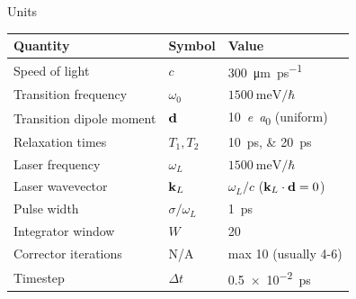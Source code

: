 \documentclass[aspectratio=169]{beamer}
\begin{document}
\begin{frame}{Units}
  \begin{table}
    \begin{tabular}{lll}
      Quantity                 & Symbol            & Value                        \\ \hline \hline
      Speed of light           & $c$               & \SI{300}{\micro\meter \per \pico\second} \\
      Transition frequency     & $\omega_0$        & $\SI{1500}{\milli\eV}/\hbar$ \\
      Transition dipole moment & $\vb{d}$          & \SI{10}{\elementarycharge\bohr} (uniform) \\
      Relaxation times         & $T_{1}, T_{2}$    & \SIlist{10;20}{\pico\second} \\
      Laser frequency          & $\omega_L$        & $\SI{1500}{\milli\eV}/\hbar$ \\
      Laser wavevector         & $\vb{k}_L$        & $\omega_L/c$ ($\vb{k}_L \cdot \vb{d} = 0$) \\
      Pulse width              & $\sigma/\omega_L$ & \SI{1}{\pico\second} \\ \hline
      Integrator window        & $W$               & 20 \\
      Corrector iterations     & N/A               & max 10 (usually 4-6) \\
      Timestep                 & $\Delta t$        & \SI{0.5e-2}{\pico\second}
    \end{tabular}
  \end{table}
\end{frame}
\end{document}
